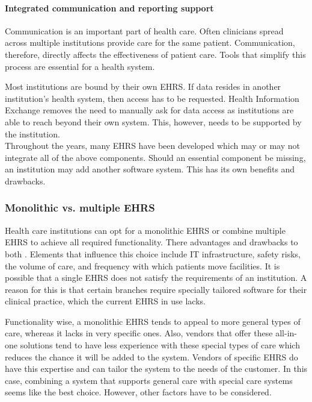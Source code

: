         \paragraph{Integrated communication and reporting support} Communication is an important part of health care. Often clinicians spread across multiple institutions provide care for the same patient. Communication, therefore, directly affects the effectiveness of patient care. Tools that simplify this process are essential for a health system. 

        Most institutions are bound by their own EHRS. If data resides in another institution's health system, then access has to be requested. Health Information Exchange removes the need to manually ask for data access as institutions are able to reach beyond their own system. This, however, needs to be supported by the institution.\\
        
        \noindent Throughout the years, many EHRS have been developed which may or may not integrate all of the above components. Should an essential component be missing, an institution may add another software system. This has its own benefits and drawbacks.

        \subsubsection{Monolithic vs. multiple EHRS} \label{ehrs_comparison}

        Health care institutions can opt for a monolithic EHRS or combine multiple EHRS to achieve all required functionality. There advantages and drawbacks to both \cite{multiple_ehrs}. Elements that influence this choice include IT infrastructure, safety risks, the volume of care, and frequency with which patients move facilities. It is possible that a single EHRS does not satisfy the requirements of an institution. A reason for this is that certain branches require specially tailored software for their clinical practice, which the current EHRS in use lacks.

        Functionality wise, a monolithic EHRS tends to appeal to more general types of care, whereas it lacks in very specific ones. Also, vendors that offer these all-in-one solutions tend to have less experience with these special types of care which reduces the chance it will be added to the system. Vendors of specific EHRS do have this expertise and can tailor the system to the needs of the customer. In this case, combining a system that supports general care with special care systems seems like the best choice. However, other factors have to be considered.

